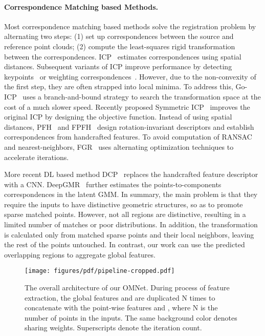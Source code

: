 \documentclass[10pt,twocolumn,letterpaper]{article}
\begin{document}
\paragraph{Correspondence Matching based Methods.}
Most correspondence matching based methods solve the registration problem by alternating two steps: (1) set up correspondences between the source and reference point clouds; (2) compute the least-squares rigid transformation between the correspondences. ICP~\cite{besl1992method} estimates correspondences using spatial distances. Subsequent variants of ICP improve performance by detecting keypoints~\cite{gelfand2003geometrically, rusinkiewicz-normal-sampling} or weighting correspondences~\cite{godin1994three}. However, due to the non-convexity of the first step, they are often strapped into local minima. To address this, Go-ICP~\cite{yang2013go} uses a branch-and-bound strategy to search the transformation space at the cost of a much slower speed. Recently proposed Symmetric ICP~\cite{rusinkiewicz2019symmetric} improves the original ICP by designing the objective function. Instead of using spatial distances, PFH~\cite{rusu2008aligning} and FPFH~\cite{FPFH} design rotation-invariant descriptors and establish correspondences from handcrafted features. To avoid computation of RANSAC~\cite{fischler1981random} and nearest-neighbors, FGR~\cite{zhou2016fast} uses alternating optimization techniques to accelerate iterations. 

More recent DL based method DCP~\cite{wang2019deep} replaces the handcrafted feature descriptor with a CNN. DeepGMR~\cite{yuan2020deepgmr} further estimates the points-to-components correspondences in the latent GMM.
In summary, the main problem is that they require the inputs to have distinctive geometric structures, so as to promote sparse matched points. However, not all regions are distinctive, resulting in a limited number of matches or poor distributions. In addition, the transformation is calculated only from matched sparse points and their local neighbors, leaving the rest of the points untouched. In contrast, our work can use the predicted overlapping regions to aggregate global features.
\begin{figure*}[t]
    \centering
    \texttt{[image: figures/pdf/pipeline-cropped.pdf]}\\
    \caption{The overall architecture of our OMNet. During process of feature extraction, the global features  and  are duplicated N times to concatenate with the point-wise features  and , where N is the number of points in the inputs. The same background color denotes sharing weights. Superscripts denote the iteration count.}
    \vspace{-0.37cm}
    \label{fig:pipeline}
\end{figure*} \vspace{-0.4cm}
\end{document}

